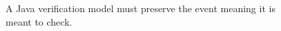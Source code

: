 \begin{figure}[H]
\centering
{}
\caption{A Java verification model must preserve the event meaning it is meant to check.}\label{fig:teach-P-01a-language-lesson-04}
\end{figure}
